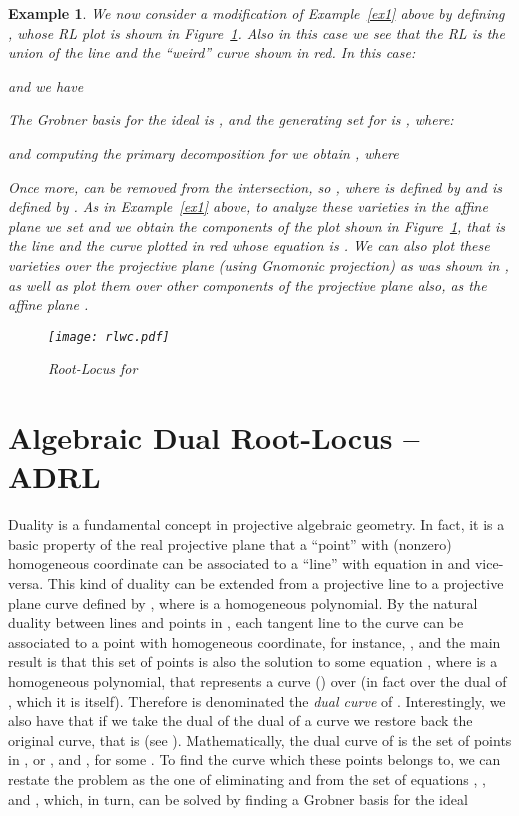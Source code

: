 \documentclass{article}
\newtheorem{example}{Example}[section]
\begin{document}
\begin{example} \em \label{ex2} We now consider a modification of Example~\ref{ex1} 
above by defining , whose RL plot is shown in Figure~\ref{rlwc}. Also
in this case we see that the RL is the union of the line  and the ``weird'' curve shown in red. In this case:

and we have 

The Grobner basis for the ideal  is , and the generating set for 
 is , where:

and computing the primary decomposition for  we obtain , where

Once more,  can be removed from the intersection, so ,
where  is defined by  and  is defined by 
. As in Example~\ref{ex1} above, to analyze
these varieties in the affine  plane we set  and we obtain the components of the 
plot shown in Figure~\ref{rlwc}, that is the line  and the curve plotted in red whose equation 
is . We can also 
plot these varieties over the projective plane (using Gnomonic projection) as was shown in \cite{pjrl}, as well
as plot them over other components of the projective plane also, as the affine plane .



\begin{figure}
\begin{center}
\texttt{[image: rlwc.pdf]} 
\caption{\label{rlwc} Root-Locus for } 
\end{center}
\end{figure} 



\end{example}



\section{Algebraic Dual Root-Locus -- ADRL} \label{darl}
Duality is a fundamental concept in projective algebraic geometry. In fact, it is a basic
property of the real projective plane  that a ``point'' with (nonzero) homogeneous
coordinate  can be associated to a ``line'' with equation  in and vice-versa.
This kind of duality can be extended from a projective line to a projective plane curve  
defined by , where  is a homogeneous polynomial. 
By the natural duality between lines and points in , 
each tangent line to the curve can 
be associated to a point with homogeneous coordinate, for instance, , and the main result is that this 
set of points is also the solution to some equation , where  is a
homogeneous polynomial, that represents a curve () over  (in fact over the dual 
of , which it is itself). Therefore  
 is denominated the {\em dual curve} of . Interestingly, we also have that if we take the dual of the 
dual of a curve we restore back the original curve, that is  (see \cite{gray}). Mathematically, 
the dual curve of  is the set of points  in 
, or ,  and ,
for some . To find the curve which these points belongs to, we can restate the problem as the one of 
eliminating  and  from the set of equations 
, ,  and 
, which, in turn, can be solved by finding a Grobner basis for the ideal
\end{document}
